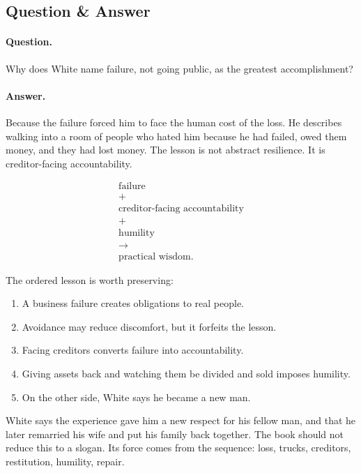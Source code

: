 \documentclass[11pt,oneside]{book}
\begin{document}
\subsection{Question \& Answer}

\paragraph{Question.}
Why does White name failure, not going public, as the greatest accomplishment?

\paragraph{Answer.}
Because the failure forced him to face the human cost of the loss. He describes walking into a room of people who hated him because he had failed, owed them money, and they had lost money. The lesson is not abstract resilience. It is creditor-facing accountability.

\begin{equation}
\begin{gathered}
\text{failure}\\
+\\
\text{creditor-facing accountability}\\
+\\
\text{humility}\\
\longrightarrow\\
\text{practical wisdom}.
\end{gathered}
\end{equation}

The ordered lesson is worth preserving:

\begin{enumerate}
\item A business failure creates obligations to real people.
\item Avoidance may reduce discomfort, but it forfeits the lesson.
\item Facing creditors converts failure into accountability.
\item Giving assets back and watching them be divided and sold imposes humility.
\item On the other side, White says he became a new man.
\end{enumerate}

White says the experience gave him a new respect for his fellow man, and that he later remarried his wife and put his family back together. The book should not reduce this to a slogan. Its force comes from the sequence: loss, trucks, creditors, restitution, humility, repair.
\end{document}
